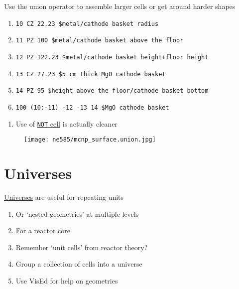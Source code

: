 \documentclass[aspectratio=1610,pdftex,dvipsnames,compress,xcolor={dvipsnames}]{beamer}
\begin{document}
\begin{frame}{Use the union operator to assemble larger cells or get around harder shapes}
    \small
    \begin{enumerate}[series=outerlist,topsep=0pt,itemsep=1pt,leftmargin=*,label=(\arabic*)]
        \item[]\texttt{10     CZ  22.23         \$metal/cathode basket radius}
        \item[]\texttt{11     PZ  100           \$metal/cathode basket above the floor}
        \item[]\texttt{12     PZ  122.23        \$metal/cathode basket height+floor height}
        \item[]\texttt{13     CZ  27.23         \$5 cm thick MgO cathode basket}
        \item[]\texttt{14     PZ  95            \$height above the floor/cathode basket bottom}
            \vspace{0.10in}
        \item[]\texttt{100    (10:-11)  -12 -13 14   \$MgO cathode basket}
    \end{enumerate}
    \normalsize
    \begin{enumerate}[series=outerlist,topsep=19pt,itemsep=21pt,leftmargin=*,label=(\arabic*)]
        \item[]Use of \href{https://github.com/TheDoctorRAB/igem}{\texttt{NOT} cell} is actually cleaner 
    \end{enumerate}
\end{frame}


\begin{frame}{}
    \begin{figure}
        \centering
        \texttt{[image: ne585/mcnp\_surface.union.jpg]}
    \end{figure}
\end{frame}


\section{Universes}


\addtocounter{framenumber}{-1} 
\begin{frame}{\href{https://github.com/TheDoctorRAB/igem}{Universes} are useful for repeating units}
    \begin{enumerate}[series=outerlist,topsep=0pt,itemsep=21pt,leftmargin=*,label=(\arabic*)]
        \item[]Or `nested geometries' at multiple levels
        \item[]For a reactor core
        \item[]Remember `unit cells' from reactor theory?
        \item[]Group a collection of cells into a universe
        \item[]Use VisEd for help on geometries
    \end{enumerate}
\end{frame}
\end{document}
